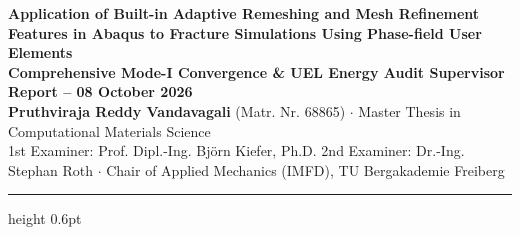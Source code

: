 \documentclass[10.5pt,a4paper]{article}
\begin{document}
\begin{center}
  {\Large\textbf{Application of Built-in Adaptive Remeshing and Mesh Refinement Features in Abaqus to Fracture Simulations Using Phase-field User Elements}}\\[0.3em]
  {\large\textbf{Comprehensive Mode-I Convergence \& UEL Energy Audit Supervisor Report -- 08 October 2026}}\\[0.2em]
  {\normalsize\textbf{Pruthviraja Reddy Vandavagali} (Matr. Nr. 68865) \quad $\cdot$ \quad Master Thesis in Computational Materials Science}\\[0.15em]
  {\footnotesize 1st Examiner: Prof. Dipl.-Ing. Bj\"orn Kiefer, Ph.D. \quad 2nd Examiner: Dr.-Ing. Stephan Roth \quad $\cdot$ \quad Chair of Applied Mechanics (IMFD), TU Bergakademie Freiberg}
\end{center}
\vspace{-0.4em}
\hrule height 0.6pt
\vspace{0.4em}


\clearpage


\clearpage


\clearpage


\clearpage


\clearpage


\clearpage


\clearpage


\clearpage


\end{document}
